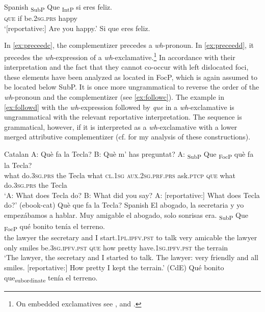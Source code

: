 \ea Spanish
\ea  \gll 	{\ob}\textsubscript{SubP} Que{\cb} {\ob}\textsubscript{IntP} si{\cb} eres feliz. \\
{} \textsc{que} {} if be.\textsc{2sg.prs} happy\\
\glt `[reportative:] Are you happy.'\label{ex:preceedb}
\ex * Si que eres feliz. \label{ex:followb} 
\z
\z


In \eqref{ex:preceedc}, the complementizer precedes a \textit{wh}-pronoun. In \eqref{ex:preceedd}, it precedes the \textit{wh}-expression of a \textit{wh}-exclamative.\footnote{ On embedded exclamatives see \citet{Zanuttini2003},  \citet{Saeboe2010} and  \citet{Gutierrez-Rexach2016}.} In accordance with their interpretation and the fact that they cannot co-occur with left dislocated foci, these elements have been analyzed as located in FocP, which is  again assumed to be located  below SubP. It is once more ungrammatical to reverse the order of the \textit{wh}-pronoun and the complementizer  (see \ref{ex:followc}).  The example in \eqref{ex:followd} with the \textit{wh}-expression followed by \emph{que} in a \textit{wh}-exclamative is  ungrammatical with the relevant reportative interpretation. The sequence is  grammatical, however, if it is interpreted as a \textit{wh}-exclamative with a lower merged attributive complementizer (cf.   for my analysis of these constructions).\largerpage[-1]\pagebreak
 

\ea Catalan 
\ea
 \gll A: Què fa la Tecla? B: Què m' has preguntat? A: 	{\ob}\textsubscript{SubP} Que{\cb}  {\ob}\textsubscript{FocP} què{\cb} fa la Tecla? \\
	{ } what do.\textsc{3sg.prs} the Tecla { } what \textsc{cl.1sg} \textsc{aux.2sg.prf.prs} ask.\textsc{ptcp} { } { } \textsc{que} {} what do.\textsc{3sg.prs} the Tecla\\
	\glt `A: What does Tecla do? B: What did you say? A: [reportative:] What does Tecla do?' (ebook-cat) \label{ex:preceedc} 
	\ex  * Què que fa la Tecla?\label{ex:followc} 
\z
\ex Spanish
	\ea \gll El abogado, la secretaria y yo empezábamos a hablar. Muy amigable el abogado, solo sonrisas era. {\ob}\textsubscript{SubP} Que{\cb} {\ob}\textsubscript{FocP} qué bonito{\cb} tenía el terreno. \\
	the lawyer the secretary and I start.\textsc{1pl.ipfv.pst} to talk very amicable the lawyer only smiles be.\textsc{3sg.ipfv.pst} {} \textsc{que} {} how pretty have.\textsc{1sg.ipfv.pst} the terrain  \\
	\glt `The lawyer, the secretary and I started to talk. The lawyer: very friendly and all smiles. [reportative:] How pretty I kept the terrain.' (CdE)\label{ex:preceedd}
\ex * Qué bonito que\textsubscript{subordinate} tenía el terreno. \label{ex:followd}
\z
\z



